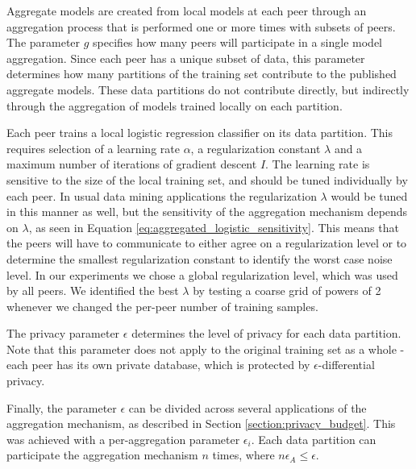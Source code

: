 Aggregate models are created from local models at each peer through an aggregation process that is performed one or more times with subsets of peers. The parameter $g$ specifies how many peers will participate in a single model aggregation. Since each peer has a unique subset of data, this parameter determines how many partitions of the training set contribute to the published aggregate models. These data partitions do not contribute directly, but indirectly through the aggregation of models trained locally on each partition.

Each peer trains a local logistic regression classifier on its data partition. This requires selection of a learning rate $\alpha$, a regularization constant $\lambda$ and a maximum number of iterations of gradient descent $I$. The learning rate is sensitive to the size of the local training set\cite{wilson20013learningrate}, and should be tuned individually by each peer. In usual data mining applications the regularization $\lambda$ would be tuned in this manner as well, but the sensitivity of the aggregation mechanism depends on $\lambda$, as seen in Equation \ref{eq:aggregated_logistic_sensitivity}. This means that the peers will have to communicate to either agree on a regularization level or to determine the smallest regularization constant to identify the worst case noise level. In our experiments we chose a global regularization level, which was used by all peers. We identified the best $\lambda$ by testing a coarse grid of powers of 2 whenever we changed the per-peer number of training samples.


The privacy parameter $\epsilon$ determines the level of privacy for each data partition. Note that this parameter does not apply to the original training set as a whole - each peer has its own private database, which is protected by $\epsilon$-differential privacy. 

Finally, the parameter $\epsilon$ can be divided across several applications of the aggregation mechanism, as described in Section \ref{section:privacy_budget}. This was achieved with a per-aggregation parameter $\epsilon_i$. Each data partition can participate the aggregation mechanism $n$ times, where $n\epsilon_A \leq \epsilon$.

